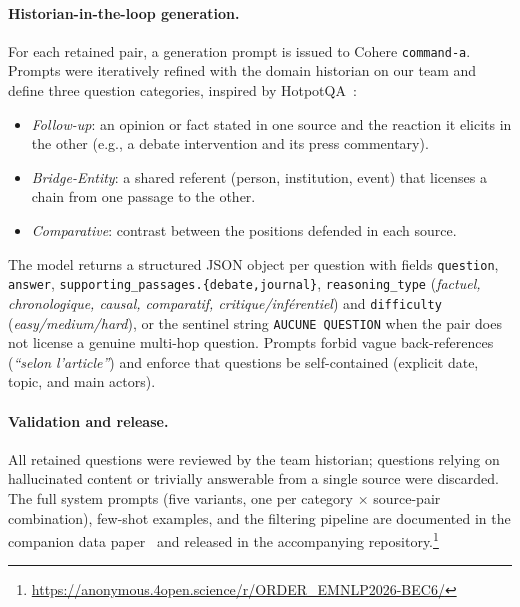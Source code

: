 \paragraph{Historian-in-the-loop generation.}
For each retained pair, a generation prompt is issued to Cohere
\texttt{command-a}. Prompts were iteratively refined with the
domain historian on our team and define three question categories,
inspired by HotpotQA~\cite{hotpotqa_2018}:
\begin{itemize}[leftmargin=1.2em,itemsep=0.15em,topsep=0.25em]
  \item \textit{Follow-up}: an opinion or fact stated in one source and
    the reaction it elicits in the other (e.g., a debate intervention
    and its press commentary).
  \item \textit{Bridge-Entity}: a shared referent (person, institution,
    event) that licenses a chain from one passage to the other.
  \item \textit{Comparative}: contrast between the positions defended in
    each source.
\end{itemize}
The model returns a structured JSON object per question with fields
\texttt{question}, \texttt{answer},
\texttt{supporting\_passages.\{debate,journal\}},
\texttt{reasoning\_type} (\textit{factuel, chronologique, causal,
comparatif, critique/inférentiel}) and \texttt{difficulty}
(\textit{easy/medium/hard}), or the sentinel string
\texttt{AUCUNE QUESTION} when the pair does not license a genuine
multi-hop question. Prompts forbid vague back-references
(\textit{``selon l'article''}) and enforce that questions be
self-contained (explicit date, topic, and main actors).

\paragraph{Validation and release.}
All retained questions were reviewed by the team historian; questions
relying on hallucinated content or trivially answerable from a single
source were discarded. The full system prompts (five variants, one per
category $\times$ source-pair combination), few-shot examples, and the
filtering pipeline are documented in the companion data
paper~\cite{historiqa-pellet} and released in the accompanying
repository.\footnote{\url{https://anonymous.4open.science/r/ORDER_EMNLP2026-BEC6/}}

